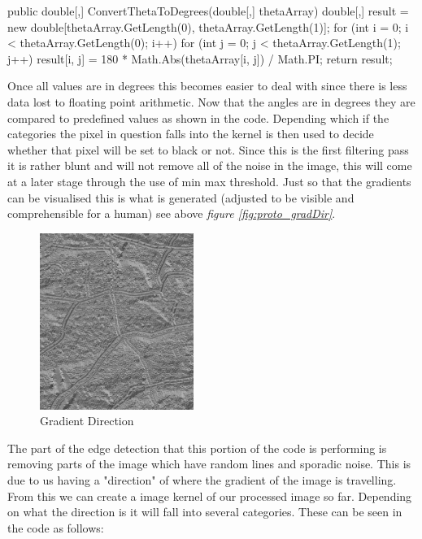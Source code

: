 \begin{flushleft}
        \begin{cscode}
public double[,] ConvertThetaToDegrees(double[,] thetaArray)
{
    double[,] result = new double[thetaArray.GetLength(0), thetaArray.GetLength(1)];
    for (int i = 0; i < thetaArray.GetLength(0); i++) for (int j = 0; j < thetaArray.GetLength(1); j++) result[i, j] = 180 * Math.Abs(thetaArray[i, j]) / Math.PI;
    return result;
}
        \end{cscode}
        
        Once all values are in degrees this becomes easier to deal with since there is less data lost to floating point arithmetic. Now that the angles are in degrees they are compared to predefined values as shown in the code. Depending which if the categories the pixel in question falls into the kernel is then used to decide whether that pixel will be set to black or not. Since this is the first filtering pass it is rather blunt and will not remove all of the noise in the image, this will come at a later stage through the use of min max threshold. Just so that the gradients can be visualised this is what is generated (adjusted to be visible and comprehensible for a human) see above \textit{figure \ref{fig:proto_gradDir}}. \\ \bk

        \begin{figure}[H]
            \centering
            \includegraphics[width=5cm]{images/edgeDetectionPrototype/f.jpg}
            \caption{Gradient Direction}
            \label{fig:proto_gradDirection}
        \end{figure} \bk


        The part of the edge detection that this portion of the code is performing is removing parts of the image which have random lines and sporadic noise. This is due to us having a "direction" of where the gradient of the image is travelling. From this we can create a image kernel of our processed image so far. Depending on what the direction is it will fall into several categories. These can be seen in the code as follows:


\end{flushleft}
